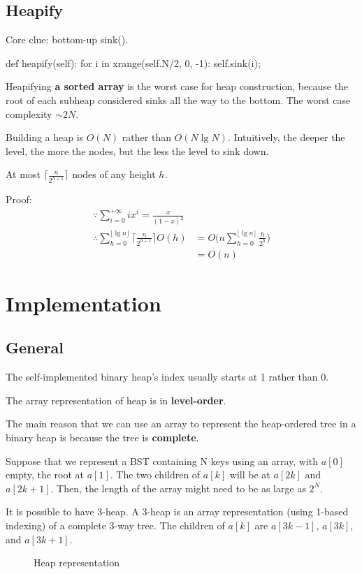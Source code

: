 \subsection{Heapify}
Core clue: bottom-up sink().
\begin{python}
def heapify(self):
    for i in xrange(self.N/2, 0, -1):
        self.sink(i);
\end{python}
 Heapifying \textbf{a sorted array} is the worst case for heap construction, because the root of each subheap considered sinks all the way to the bottom. The worst case complexity $\sim 2N$. 

Building a heap is $O(N)$ rather than $O(N \lg N)$. Intuitively, the deeper the level, the more the nodes, but the less the level to sink down. 

At most $\big\lceil\frac{n}{2^{h+1}}\big\rceil$ nodes of any height $h$.

Proof:
\begin{align*}
\because \sum_{i=0}^{+\infty} {ix^i} =\frac{x}{(1-x)^2} \\
\therefore \sum_{h=0}^{\lfloor\lg n\rfloor}{\Big\lceil\frac{n}{2^{h+1}}\Big\rceil
O(h)} &= O\Bigg(n\sum_{h=0}^{\lfloor\lg n\rfloor}{\frac{h}{2^h}}\Bigg) \\
&= O(n)
\end{align*}

\section{Implementation}
\subsection{General}
The self-implemented binary heap's index usually starts at 1 rather than 0. 

The array representation of heap is in \textbf{level-order}.

The main reason that we can use an array to represent the heap-ordered tree in a binary heap is because the tree is \textbf{complete}.

Suppose that we represent a BST containing N keys using an array, with $a[0]$ empty, the root at $a[1]$. The two children of $a[k]$ will be at $a[2k]$ and $a[2k+1]$. Then, the length of the array might need to be as large as $2^N$.

It is possible to have 3-heap. A 3-heap is an array representation (using 1-based indexing) of a complete 3-way tree.
The children of $a[k]$ are $a[3k-1]$, $a[3k]$, and $a[3k+1]$.
\begin{figure}[hbtp]
\centering
{}
\caption{Heap representation}
\label{fig:heap} 
\end{figure}

